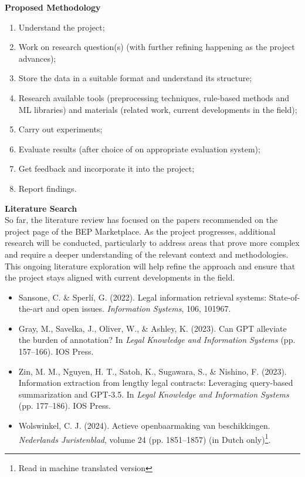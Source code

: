 \documentclass[11pt]{article}
\begin{document}
\textbf{Proposed Methodology}
\setlength{\itemsep}{0pt} %
\begin{enumerate}
    \item Understand the project;
    \item Work on research question(s) (with further refining happening as the project advances);
    \item Store the data in a suitable format and understand its structure;
    \item Research available tools (preprocessing techniques, rule-based methods and ML libraries) and materials (related work, current developments in the field);
    \item Carry out experiments;
    \item Evaluate results (after choice of on appropriate evaluation system);
    \item Get feedback and incorporate it into the project;
    \item Report findings.
\end{enumerate}

\textbf{Literature Search}\\
So far, the literature review has focused on the papers recommended on the project page of the BEP Marketplace. As the project progresses, additional research will be conducted, particularly to address areas that prove more complex and require a deeper understanding of the relevant context and methodologies. This ongoing literature exploration will help refine the approach and ensure that the project stays aligned with current developments in the field.

\begin{itemize}
    \item Sansone, C. \& Sperlí, G. (2022). Legal information retrieval systems: State-of-the-art and open issues. \textit{Information Systems}, 106, 101967.
    \item Gray, M., Savelka, J., Oliver, W., \& Ashley, K. (2023). Can GPT alleviate the burden of annotation? In \textit{Legal Knowledge and Information Systems} (pp. 157–166). IOS Press.
    \item Zin, M. M., Nguyen, H. T., Satoh, K., Sugawara, S., \& Nishino, F. (2023). Information extraction from lengthy legal contracts: Leveraging query-based summarization and GPT-3.5. In \textit{Legal Knowledge and Information Systems} (pp. 177–186). IOS Press.
    \item Wolswinkel, C. J. (2024). Actieve openbaarmaking van beschikkingen. \textit{Nederlands Juristenblad}, volume 24 (pp. 1851–1857) (in Dutch only)\footnote{Read in machine translated version}.
\end{itemize}
\end{document}
